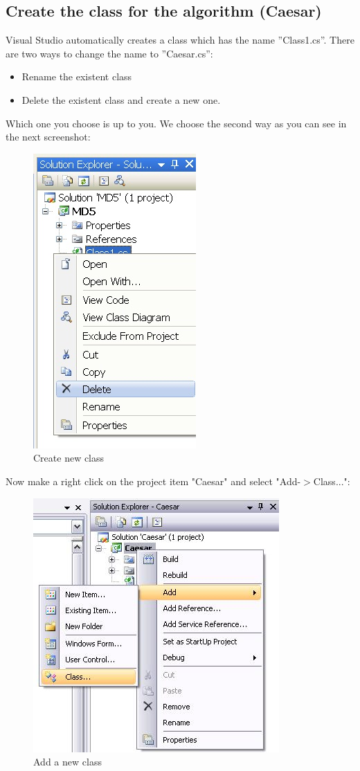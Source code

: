 \subsection{Create the class for the algorithm (Caesar)}\label{sec:CreateTheClassForTheAlgorithmCaesar}
Visual Studio automatically creates a class which has the name ''Class1.cs''.  There are two ways to change the name to ''Caesar.cs'':
\renewcommand{\labelitemi}{-}
\begin{itemize}
	\item Rename the existent class
	\item Delete the existent class and create a new one.
\end{itemize}\clearpage
Which one you choose is up to you. We choose the second way as you can see in the next screenshot:
\begin{figure}[h!]
	\centering
		\includegraphics{figures/new_class.jpg}
	\caption{Create new class}
	\label{fig:new_class}
\end{figure}\clearpage
Now make a right click on the project item "Caesar" and select "Add-$>$Class...":
\begin{figure}[h]
	\centering
		\includegraphics{figures/add_new_class.jpg}
	\caption{Add a new class}
	\label{fig:add_new_class}
\end{figure}\clearpage
